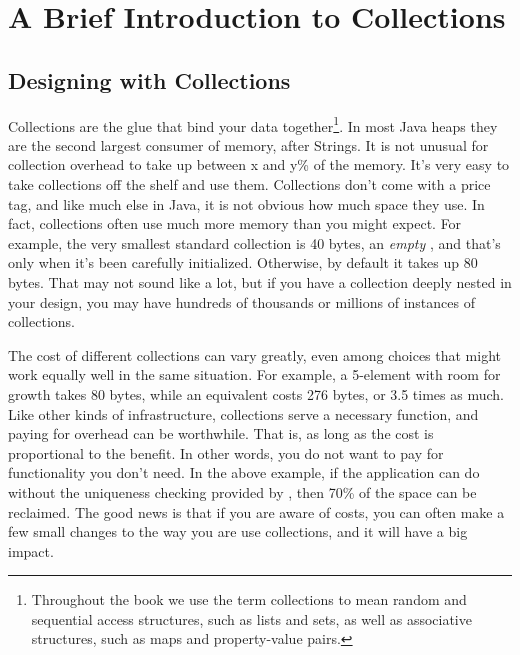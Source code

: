 \chapter{A Brief Introduction to Collections}
\label{chapter:brief-introduction-collections}

\section{Designing with Collections}
Collections are the glue that bind your data together\footnote{Throughout the
book we use the term collections to mean random and sequential access
structures, such as lists and sets, as well as associative structures, such as maps and property-value
pairs.}. In most Java heaps they are the second largest consumer of memory,
after Strings.  It is not unusual for collection overhead to take up between
x and y\% of the memory. It's very easy to take collections off the shelf
and use them. Collections don't come with a price tag, and like much else
in Java, it is not obvious how much space they use. In fact,
collections often use much more memory than you might expect. For example,
the very smallest standard collection is 40 bytes, an \emph{empty}
, and that's only when it's been carefully initialized. 
Otherwise, by default it takes up 80 bytes. That may not sound like a lot,
but if you have a collection deeply nested in your design, you may have hundreds
of thousands or millions of instances of collections.

The cost of
different collections can vary greatly, even among choices that might work
equally well in the same situation. For example, a 5-element 
with room for growth takes 80 bytes, while an equivalent  costs 276 bytes, or 3.5 times as much. 
Like other kinds of infrastructure, collections serve a necessary
function, and paying for overhead can be worthwhile.  That is, as long as
the cost is proportional to the benefit. In other words, you do not want to pay
for functionality you don't need. In the above example, if
the application can do without the uniqueness checking provided by
, then 70\% of the space can be reclaimed.  The good news is that
if you are aware of costs, you can often make a few small changes to
the way you are use collections, and it will have a big impact.


